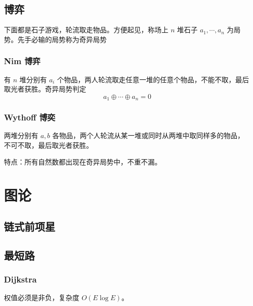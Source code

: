 \documentclass{probook}
\begin{document}
\begin{multicols}{2}
\section{博弈}

下面都是石子游戏，轮流取走物品。方便起见，称场上 $n$ 堆石子 $a_1,\cdots,a_n$ 为局势。先手必输的局势称为奇异局势

\subsection{Nim 博弈}

有 $n$ 堆分别有 $a_i$ 个物品，两人轮流取走任意一堆的任意个物品，不能不取，最后取光者获胜。奇异局势判定
\[a_1 \oplus \cdots \oplus a_n =0\]

\subsection{Wythoff 博奕}

两堆分别有 $a,b$ 各物品，两个人轮流从某一堆或同时从两堆中取同样多的物品，不可不取，最后取光者获胜。



特点：所有自然数都出现在奇异局势中，不重不漏。







\chapter{图论}

\section{链式前项星}



\section{最短路}

\subsection{Dijkstra}

权值必须是非负，复杂度 $O(E\log E)$。




\end{multicols}
\end{document}
